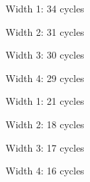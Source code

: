 \documentclass[11pt]{article}
\newcommand{\code}[1]{\texttt{#1}}
\newcommand{\cycletable}[1]{{\scriptsize\setlength{\tabcolsep}{2.5pt}}}
\newcommand{\widthtable}[3]{\begin{minipage}[t]{0.49\textwidth}\centering
  {\small Width #2: #3 cycles}\par\smallskip\cycletable{#1}\end{minipage}}
\begin{document}
\begin{table}[htbp]
\centering
\caption{\code{t5\_loop} at widths 1 to 4.}
\widthtable{t5_loop.w1}{1}{34}\hfill
\widthtable{t5_loop.w2}{2}{31}

\bigskip
\widthtable{t5_loop.w3}{3}{30}\hfill
\widthtable{t5_loop.w4}{4}{29}
\end{table}

\begin{table}[htbp]
\centering
\caption{\code{t6\_beq\_mispredict} at widths 1 to 4.}
\widthtable{t6_beq_mispredict.w1}{1}{21}\hfill
\widthtable{t6_beq_mispredict.w2}{2}{18}

\bigskip
\widthtable{t6_beq_mispredict.w3}{3}{17}\hfill
\widthtable{t6_beq_mispredict.w4}{4}{16}
\end{table}
\end{document}
